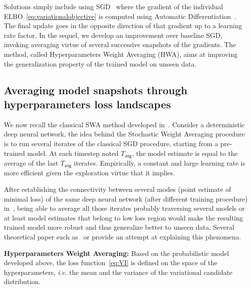 \documentclass{article} %
\begin{document}
Solutions simply include using SGD~\citep{bottou2008tradeoffs} where the gradient of the individual ELBO~\eqref{eq:variationalobjective} is computed using Automatic Differentiation~\citep{kucukelbir2017automatic}. The final update goes in the opposite direction of that gradient up to a learning rate factor.
In the sequel, we develop an improvement over baseline SGD, invoking averaging virtue of several successive snapshots of the gradients.
The method, called Hyperparameters Weight Averaging (HWA), aims at improving the generalization property of the trained model on unseen data.


\subsection{Averaging model snapshots through hyperparameters loss landscapes}

We now recall the classical SWA method developed in~\citep{izmailov2018averaging}. 
Consider a deterministic deep neural network, the idea behind the Stochastic Weight Averaging procedure is to run several iterates of the classical SGD procedure, starting from a pre-trained model.
At each timestep noted $T_{\mathsf{avg}}$, the model estimate is equal to the average of the last $T_{\mathsf{avg}}$ iterates.
Empirically, a constant and large learning rate is more efficient given the exploration virtue that it implies.

After establishing the connectivity between several modes (point estimate of minimal loss) of the same deep neural network (after different training procedure) in~\citep{garipov2018loss}, being able to average all those iterates probably traversing several models or at least model estimates that belong to low loss region would make the resulting trained model more robust and thus generalize better to unseen data.
Several theoretical paper such as~\citep{he2019asymmetric} or \citep{keskar2016large} provide an attempt at explaining this phenomena.


\textbf{Hyperparameters Weight Averaging:}
Based on the probabilistic model developed above, the loss function~\eqref{eq:VI} is defined on the space of the hyperparameters, \textit{i.e.} the mean and the variance of the variational candidate distribution.
\end{document}
